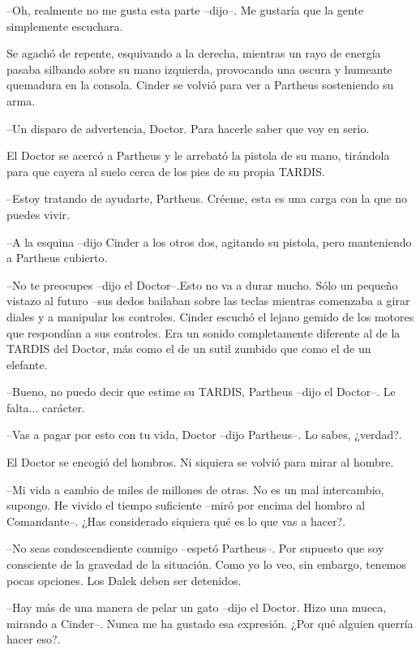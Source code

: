 --Oh, realmente no me gusta esta parte --dijo--. Me gustaría que la gente simplemente escuchara.



Se agachó de repente, esquivando a la derecha, mientras un rayo de energía pasaba silbando sobre su mano izquierda, provocando una oscura y humeante quemadura en la consola. Cinder se volvió para ver a Partheus sosteniendo su arma. 



--Un disparo de advertencia, Doctor. Para hacerle saber que voy en serio.



El Doctor se acercó a Partheus y le arrebató la pistola de su mano, tirándola para que cayera al suelo cerca de los pies de su propia TARDIS.



--Estoy tratando de ayudarte, Partheus. Créeme, esta es una carga con la que no puedes vivir.

--A la esquina --dijo Cinder a los otros dos, agitando su pistola, pero manteniendo a Partheus cubierto.

--No te preocupes --dijo el Doctor--.Esto no va a durar mucho. Sólo un pequeño vistazo al futuro --sus dedos bailaban sobre las teclas mientras comenzaba a girar diales y a manipular los controles. Cinder escuchó el lejano gemido de los motores que respondían a sus controles. Era un sonido completamente diferente al de la TARDIS del Doctor, más como el de un sutil zumbido que como el de un elefante.

--Bueno, no puedo decir que estime su TARDIS, Partheus --dijo el Doctor--. Le falta... carácter.

--Vas a pagar por esto con tu vida, Doctor --dijo Partheus--. Lo sabes, ¿verdad?.



El Doctor se encogió del hombros. Ni siquiera se volvió para mirar al hombre. 



--Mi vida a cambio de miles de millones de otras. No es un mal intercambio, supongo. He vivido el tiempo suficiente --miró por encima del hombro al Comandante--. ¿Has considerado siquiera qué es lo que vas a hacer?.

--No seas condescendiente conmigo --espetó Partheus--. Por supuesto que soy consciente de la gravedad de la situación. Como yo lo veo, sin embargo, tenemos pocas opciones. Los Dalek deben ser detenidos.

--Hay más de una manera de pelar un gato --dijo el Doctor. Hizo una mueca, mirando a Cinder--. Nunca me ha gustado esa expresión. ¿Por qué alguien querría hacer eso?.



